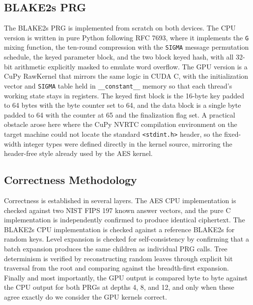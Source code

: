 \documentclass[conference]{IEEEtran}
\begin{document}
\subsection{BLAKE2s PRG}
The BLAKE2s PRG is implemented from scratch on both devices. The CPU version is written in pure Python following RFC 7693, where it implements the \texttt{G} mixing function, the ten-round compression with the \texttt{SIGMA} message permutation schedule, the keyed parameter block, and the two block keyed hash, with all 32-bit arithmetic explicitly masked to emulate word overflow. The GPU version is a CuPy RawKernel that mirrors the same logic in CUDA C, with the initialization vector and \texttt{SIGMA} table held in \texttt{\_\_constant\_\_} memory so that each thread's working state stays in registers. The keyed first block is the 16-byte key padded to 64 bytes with the byte counter set to 64, and the data block is a single byte padded to 64 with the counter at 65 and the finalization flag set. A practical obstacle arose here where the CuPy NVRTC compilation environment on the target machine could not locate the standard \texttt{<stdint.h>} header, so the fixed-width integer types were defined directly in the kernel source, mirroring the header-free style already used by the AES kernel.

\subsection{Correctness Methodology}
Correctness is established in several layers. The AES CPU implementation is checked against two NIST FIPS 197 known answer vectors, and the pure C implementation is independently confirmed to produce identical ciphertext. The BLAKE2s CPU implementation is checked against a reference BLAKE2s for random keys. Level expansion is checked for self-consistency by confirming that a batch expansion produces the same children as individual PRG calls. Tree determinism is verified by reconstructing random leaves through explicit bit traversal from the root and comparing against the breadth-first expansion. Finally and most importantly, the GPU output is compared byte to byte against the CPU output for both PRGs at depths 4, 8, and 12, and only when these agree exactly do we consider the GPU kernels correct.
\end{document}
